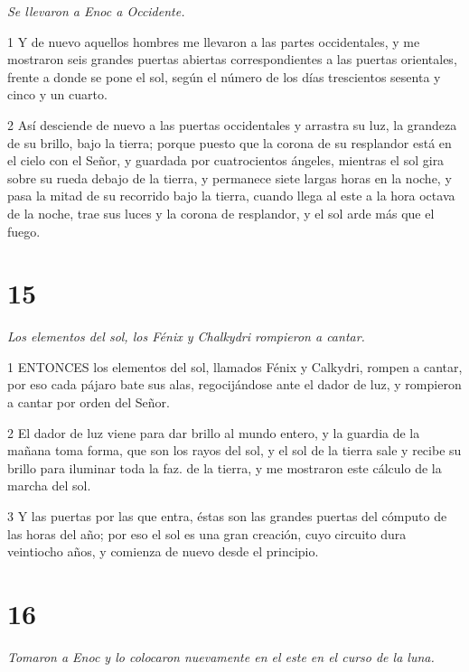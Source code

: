 \par \textit{Se llevaron a Enoc a Occidente.}

\par 1 Y de nuevo aquellos hombres me llevaron a las partes occidentales, y me mostraron seis grandes puertas abiertas correspondientes a las puertas orientales, frente a donde se pone el sol, según el número de los días trescientos sesenta y cinco y un cuarto.

\par 2 Así desciende de nuevo a las puertas occidentales y arrastra su luz, la grandeza de su brillo, bajo la tierra; porque puesto que la corona de su resplandor está en el cielo con el Señor, y guardada por cuatrocientos ángeles, mientras el sol gira sobre su rueda debajo de la tierra, y permanece siete largas horas en la noche, y pasa la mitad de su recorrido bajo la tierra, cuando llega al este a la hora octava de la noche, trae sus luces y la corona de resplandor, y el sol arde más que el fuego.

\chapter{15}

\par \textit{Los elementos del sol, los Fénix y Chalkydri rompieron a cantar.}

\par 1 ENTONCES los elementos del sol, llamados Fénix y Calkydri, rompen a cantar, por eso cada pájaro bate sus alas, regocijándose ante el dador de luz, y rompieron a cantar por orden del Señor.

\par 2 El dador de luz viene para dar brillo al mundo entero, y la guardia de la mañana toma forma, que son los rayos del sol, y el sol de la tierra sale y recibe su brillo para iluminar toda la faz. de la tierra, y me mostraron este cálculo de la marcha del sol.

\par 3 Y las puertas por las que entra, éstas son las grandes puertas del cómputo de las horas del año; por eso el sol es una gran creación, cuyo circuito dura veintiocho años, y comienza de nuevo desde el principio.

\chapter{16}

\par \textit{Tomaron a Enoc y lo colocaron nuevamente en el este en el curso de la luna.}

